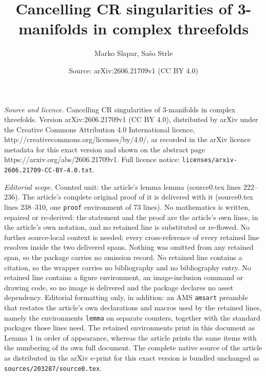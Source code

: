 \documentclass[10pt,a4paper]{amsart}
\title{Cancelling CR singularities of 3-manifolds in complex threefolds}
\author{Marko Slapar, Sa\v{s}o Strle}
\date{Source: arXiv:2606.21709v1 (CC BY 4.0)}
\begin{document}
\maketitle

\noindent\emph{Source and licence.} Cancelling CR singularities of 3-manifolds in complex threefolds. Version arXiv:2606.21709v1 (CC BY 4.0), distributed by arXiv under the Creative Commons Attribution 4.0 International licence, http://creativecommons.org/licenses/by/4.0/, as recorded in the arXiv licence metadata for this exact version and shown on the abstract page https://arxiv.org/abs/2606.21709v1. Full licence notice: \texttt{licenses/arxiv-2606.21709-CC-BY-4.0.txt}.\par\smallskip

\noindent\textit{Editorial scope.} Counted unit: the article's lemma lemma (source0.tex lines 222--236). The article's complete original proof of it is delivered with it (source0.tex lines 238--310, one \texttt{proof} environment of 73 lines). No mathematics is written, repaired or re-derived: the statement and the proof are the article's own lines, in the article's own notation, and no retained line is substituted or re-flowed.  No further source-local context is needed: every cross-reference of every retained line resolves inside the two delivered spans.  Nothing was omitted from any retained span, so the package carries no omission record.  No retained line contains a citation, so the wrapper carries no bibliography and no bibliography entry.  No retained line contains a figure environment, an image-inclusion command or drawing code, so no image is delivered and the package declares no asset dependency.  Editorial formatting only, in addition: an AMS \texttt{amsart} preamble that restates the article's own declarations and macros used by the retained lines, namely the environments \texttt{lemma} on separate counters, together with the standard packages those lines need.  The retained environments print in this document as Lemma 1 in order of appearance, whereas the article prints the same items with the numbering of its own full document.  The complete native source of the article as distributed in the arXiv e-print for this exact version is bundled unchanged as \texttt{sources/203287/source0.tex}.
\end{document}
